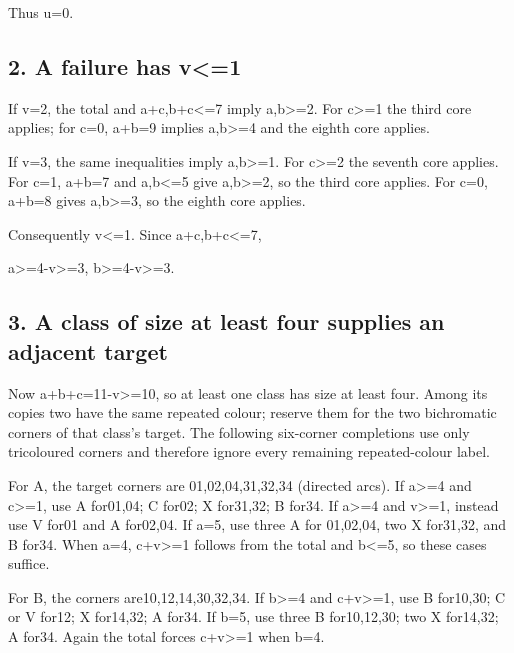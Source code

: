 \documentclass[
  10pt,
]{article}
\begin{document}
Thus u=0.

\hypertarget{a-failure-has-v1}{%
\subsection*{2. A failure has v\textless=1}\label{a-failure-has-v1}}

If v=2, the total and a+c,b+c\textless=7 imply a,b\textgreater=2. For
c\textgreater=1 the third core applies; for c=0, a+b=9 implies
a,b\textgreater=4 and the eighth core applies.

If v=3, the same inequalities imply a,b\textgreater=1. For
c\textgreater=2 the seventh core applies. For c=1, a+b=7 and
a,b\textless=5 give a,b\textgreater=2, so the third core applies. For
c=0, a+b=8 gives a,b\textgreater=3, so the eighth core applies.

Consequently v\textless=1. Since a+c,b+c\textless=7,

a\textgreater=4-v\textgreater=3, b\textgreater=4-v\textgreater=3.

\hypertarget{a-class-of-size-at-least-four-supplies-an-adjacent-target}{%
\subsection*{3. A class of size at least four supplies an adjacent
target}\label{a-class-of-size-at-least-four-supplies-an-adjacent-target}}

Now a+b+c=11-v\textgreater=10, so at least one class has size at least
four. Among its copies two have the same repeated colour; reserve them
for the two bichromatic corners of that class's target. The following
six-corner completions use only tricoloured corners and therefore ignore
every remaining repeated-colour label.

For A, the target corners are 01,02,04,31,32,34 (directed arcs). If
a\textgreater=4 and c\textgreater=1, use A for01,04; C for02; X
for31,32; B for34. If a\textgreater=4 and v\textgreater=1, instead use V
for01 and A for02,04. If a=5, use three A for 01,02,04, two X for31,32,
and B for34. When a=4, c+v\textgreater=1 follows from the total and
b\textless=5, so these cases suffice.

For B, the corners are10,12,14,30,32,34. If b\textgreater=4 and
c+v\textgreater=1, use B for10,30; C or V for12; X for14,32; A for34. If
b=5, use three B for10,12,30; two X for14,32; A for34. Again the total
forces c+v\textgreater=1 when b=4.
\end{document}
